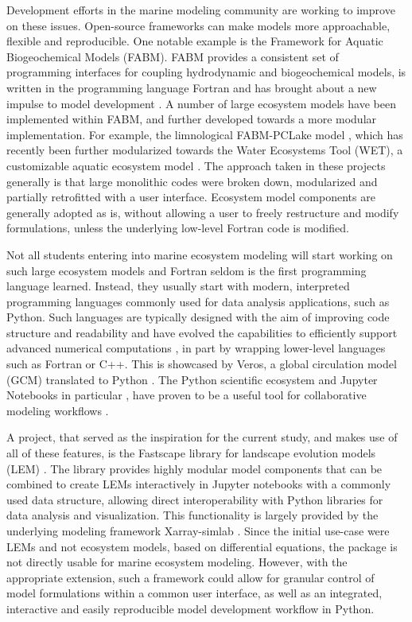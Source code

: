 \documentclass[journal abbreviation, manuscript]{copernicus}
\begin{document}
Development efforts in the marine modeling community are working to improve on these issues. Open-source frameworks can make models more approachable, flexible and reproducible. One notable example is the Framework for Aquatic Biogeochemical Models (FABM). FABM provides a consistent set of programming interfaces for coupling hydrodynamic and biogeochemical models, is written in the programming language Fortran and has brought about a new impulse to model development \citep{Bruggeman2014a}. A number of large ecosystem models have been implemented within FABM, and further developed towards a more modular implementation. For example, the limnological FABM-PCLake model \citep{Hu2016FABM-PCLakeHydrodynamics}, which has recently been further modularized towards the Water Ecosystems Tool (WET), a customizable aquatic ecosystem model \citep[][]{Schnedler-Meyer2022WaterModel}. The approach taken in these projects generally is that large monolithic codes were broken down, modularized and partially retrofitted with a user interface. Ecosystem model components are generally adopted as is, without allowing a user to freely restructure and modify formulations, unless the underlying low-level Fortran code is modified.

Not all students entering into marine ecosystem modeling will start working on such large ecosystem models and Fortran seldom is the first programming language learned. Instead, they usually start with modern, interpreted programming languages commonly used for data analysis applications, such as Python. Such languages are typically designed with the aim of improving code structure and readability and have evolved the capabilities to efficiently support advanced numerical computations \citep{Lin2012}, in part by wrapping lower-level languages such as Fortran or C++. This is showcased by Veros, a global circulation model (GCM) translated to Python \citep{Hafner2018VerosPython}. The Python scientific ecosystem and Jupyter Notebooks in particular \citep{Kluyver2016JupyterWorkflows}, have proven to be a useful tool for collaborative modeling workflows \citep[e.g. eWaterCycle platform,][]{Hut2022TheCollaboration}. 

A project, that served as the inspiration for the current study, and makes use of all of these features, is the Fastscape library for landscape evolution models (LEM) \citep{Bovy2021Fastscape-lem/fastscape:V0.1.0beta3}. The library provides highly modular model components that can be combined to create LEMs interactively in Jupyter notebooks with a commonly used data structure, allowing direct interoperability with Python libraries for data analysis and visualization. This functionality is largely provided by the underlying modeling framework Xarray-simlab \citep{Bovy2021Benbovy/xarray-simlab:0.5.0}. Since the initial use-case were LEMs and not ecosystem models, based on differential equations, the package is not directly usable for marine ecosystem modeling. However, with the appropriate extension, such a framework could allow for granular control of model formulations within a common user interface, as well as an integrated, interactive and easily reproducible model development workflow in Python.
\end{document}
